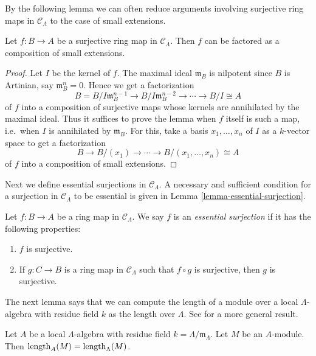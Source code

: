 \noindent 
By the following lemma we can often reduce arguments involving surjective ring 
maps in $\mathcal C_{\Lambda}$ to the case of small extensions.
\begin{lemma}
\label{lemma-factor-small-extension}
Let $f: B \rightarrow A$ be a surjective ring map in $\mathcal C_{\Lambda}$. 
Then $f$ can be factored as a composition of small extensions.
\end{lemma}

\begin{proof}
Let $I$ be the kernel of $f$.  The maximal ideal $\mathfrak{m}_{B}$ is 
nilpotent since $B$ is Artinian, say $\mathfrak{m}_{B}^n = 0$. Hence we get a 
factorization
\[ B = B/I\mathfrak{m}_B^{n-1} \rightarrow B/I\mathfrak{m}_B^{n-2} \rightarrow 
\cdots \rightarrow B/I \cong A \]
of $f$ into a composition of surjective maps whose kernels are annihilated by 
the maximal ideal.  Thus it suffices to prove the lemma when $f$ itself is such 
a map, i.e.\ when $I$ is annihilated by $\mathfrak{m}_B$. For this, take a 
basis $x_1, \dots, x_n$ of $I$ as a $k$-vector space to get a factorization
\[ B \rightarrow B/(x_1) \rightarrow \cdots \rightarrow  B/(x_1, \dots, x_n) 
\cong  A \]
of $f$ into a composition of small extensions.
\end{proof}

\noindent
Next we define essential surjections in $\mathcal C_{\Lambda}$.  A necessary 
and sufficient condition for a surjection in $\mathcal C_{\Lambda}$ to be 
essential is given in Lemma \ref{lemma-essential-surjection}. 
\begin{definition}
\label{definition-essential-surjection}
Let $f: B \rightarrow A$ be a ring map in $\mathcal C_{\Lambda}$.  We say $f$ 
is an \emph{essential surjection} if it has the following properties:
\begin{enumerate}
\item $f$ is surjective.
\item If $g: C \rightarrow B$ is a ring map in $\mathcal C_{\Lambda}$ such that 
$f \circ g$ is surjective, then $g$ is surjective.
\end{enumerate}
\end{definition}

\noindent
The next lemma says that we can compute the length of a module over a local 
$\Lambda$-algebra with residue field $k$ as the length over $\Lambda$.  See 
\cite[Lemma 7.45.12]{stacks-project} for a more general result.
\begin{lemma}
\label{lemma-length}
Let $A$ be a local $\Lambda$-algebra with residue field $k = 
\Lambda/\mathfrak{m}_{\Lambda}$.  Let $M$ be an $A$-module.  Then 
$\textnormal{length}_{A}(M) = \textnormal{length}_{\Lambda}(M)$.
\end{lemma}


